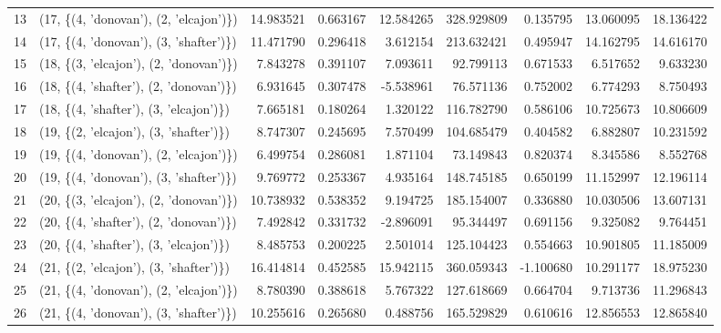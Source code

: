 \begin{tabular}{llrrrrrrr}
13 &  (17, \{(4, 'donovan'), (2, 'elcajon')\}) &  14.983521 &  0.663167 &  12.584265 &  328.929809 &  0.135795 &  13.060095 &  18.136422 \\
14 &  (17, \{(4, 'donovan'), (3, 'shafter')\}) &  11.471790 &  0.296418 &   3.612154 &  213.632421 &  0.495947 &  14.162795 &  14.616170 \\
15 &  (18, \{(3, 'elcajon'), (2, 'donovan')\}) &   7.843278 &  0.391107 &   7.093611 &   92.799113 &  0.671533 &   6.517652 &   9.633230 \\
16 &  (18, \{(4, 'shafter'), (2, 'donovan')\}) &   6.931645 &  0.307478 &  -5.538961 &   76.571136 &  0.752002 &   6.774293 &   8.750493 \\
17 &  (18, \{(4, 'shafter'), (3, 'elcajon')\}) &   7.665181 &  0.180264 &   1.320122 &  116.782790 &  0.586106 &  10.725673 &  10.806609 \\
18 &  (19, \{(2, 'elcajon'), (3, 'shafter')\}) &   8.747307 &  0.245695 &   7.570499 &  104.685479 &  0.404582 &   6.882807 &  10.231592 \\
19 &  (19, \{(4, 'donovan'), (2, 'elcajon')\}) &   6.499754 &  0.286081 &   1.871104 &   73.149843 &  0.820374 &   8.345586 &   8.552768 \\
20 &  (19, \{(4, 'donovan'), (3, 'shafter')\}) &   9.769772 &  0.253367 &   4.935164 &  148.745185 &  0.650199 &  11.152997 &  12.196114 \\
21 &  (20, \{(3, 'elcajon'), (2, 'donovan')\}) &  10.738932 &  0.538352 &   9.194725 &  185.154007 &  0.336880 &  10.030506 &  13.607131 \\
22 &  (20, \{(4, 'shafter'), (2, 'donovan')\}) &   7.492842 &  0.331732 &  -2.896091 &   95.344497 &  0.691156 &   9.325082 &   9.764451 \\
23 &  (20, \{(4, 'shafter'), (3, 'elcajon')\}) &   8.485753 &  0.200225 &   2.501014 &  125.104423 &  0.554663 &  10.901805 &  11.185009 \\
24 &  (21, \{(2, 'elcajon'), (3, 'shafter')\}) &  16.414814 &  0.452585 &  15.942115 &  360.059343 & -1.100680 &  10.291177 &  18.975230 \\
25 &  (21, \{(4, 'donovan'), (2, 'elcajon')\}) &   8.780390 &  0.388618 &   5.767322 &  127.618669 &  0.664704 &   9.713736 &  11.296843 \\
26 &  (21, \{(4, 'donovan'), (3, 'shafter')\}) &  10.255616 &  0.265680 &   0.488756 &  165.529829 &  0.610616 &  12.856553 &  12.865840 \\
\bottomrule
\end{tabular}
